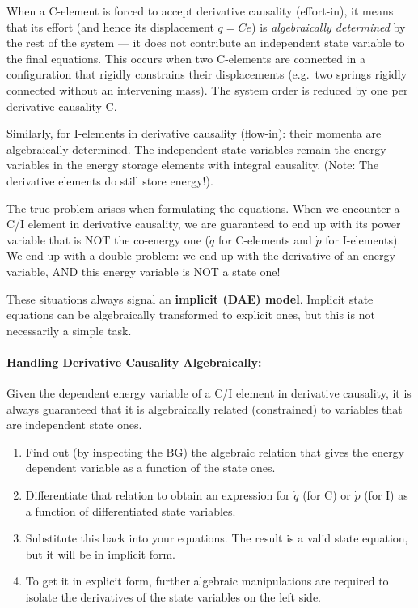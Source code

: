 When a C-element is forced to accept derivative causality (effort-in), it means that its effort (and hence its displacement $q = Ce$) is \emph{algebraically determined} by the rest of the system — it does not contribute an independent state variable to the final equations. This occurs when two C-elements are connected in a configuration that rigidly constrains their displacements (e.g.\ two springs rigidly connected without an intervening mass). The system order is reduced by one per derivative-causality C.

Similarly, for I-elements in derivative causality (flow-in): their momenta are algebraically determined. The independent state variables remain the energy variables in the energy storage elements with integral causality. (Note: The derivative elements do still store energy!).

The true problem arises when formulating the equations. When we encounter a C/I element in derivative causality, we are guaranteed to end up with its power variable that is NOT the co-energy one ($\dot{q}$ for C-elements and $\dot{p}$ for I-elements). We end up with a double problem: we end up with the derivative of an energy variable, AND this energy variable is NOT a state one!

These situations always signal an \textbf{implicit (DAE) model}. Implicit state equations can be algebraically transformed to explicit ones, but this is not necessarily a simple task. 

\paragraph{Handling Derivative Causality Algebraically:}
Given the dependent energy variable of a C/I element in derivative causality, it is always guaranteed that it is algebraically related (constrained) to variables that are independent state ones. 
\begin{enumerate}
    \item Find out (by inspecting the BG) the algebraic relation that gives the energy dependent variable as a function of the state ones.
    \item Differentiate that relation to obtain an expression for $\dot{q}$ (for C) or $\dot{p}$ (for I) as a function of differentiated state variables.
    \item Substitute this back into your equations. The result is a valid state equation, but it will be in implicit form.
    \item To get it in explicit form, further algebraic manipulations are required to isolate the derivatives of the state variables on the left side.
\end{enumerate}


